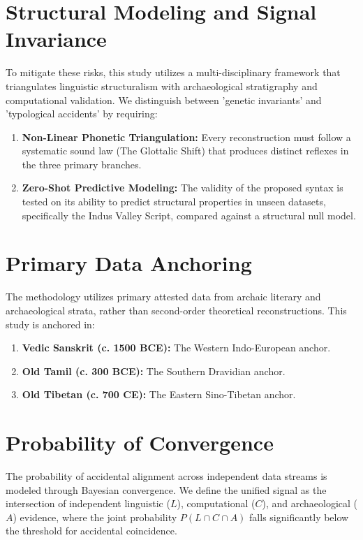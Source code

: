 \documentclass[11pt,oneside,openany]{book}
\begin{document}
\section{Structural Modeling and Signal Invariance}
To mitigate these risks, this study utilizes a multi-disciplinary framework that triangulates linguistic structuralism with archaeological stratigraphy and computational validation. We distinguish between 'genetic invariants' and 'typological accidents' by requiring:
\begin{enumerate}
    \item \textbf{Non-Linear Phonetic Triangulation:} Every reconstruction must follow a systematic sound law (The Glottalic Shift) that produces distinct reflexes in the three primary branches.
    \item \textbf{Zero-Shot Predictive Modeling:} The validity of the proposed syntax is tested on its ability to predict structural properties in unseen datasets, specifically the Indus Valley Script, compared against a structural null model.
\end{enumerate}

\section{Primary Data Anchoring}
The methodology utilizes primary attested data from archaic literary and archaeological strata, rather than second-order theoretical reconstructions. This study is anchored in:
\begin{enumerate}
    \item \textbf{Vedic Sanskrit (c. 1500 BCE):} The Western Indo-European anchor.
    \item \textbf{Old Tamil (c. 300 BCE):} The Southern Dravidian anchor.
    \item \textbf{Old Tibetan (c. 700 CE):} The Eastern Sino-Tibetan anchor.
\end{enumerate}

\section{Probability of Convergence}
The probability of accidental alignment across independent data streams is modeled through Bayesian convergence. We define the unified signal as the intersection of independent linguistic ($L$), computational ($C$), and archaeological ($A$) evidence, where the joint probability $P(L \cap C \cap A)$ falls significantly below the threshold for accidental coincidence.
\end{document}
